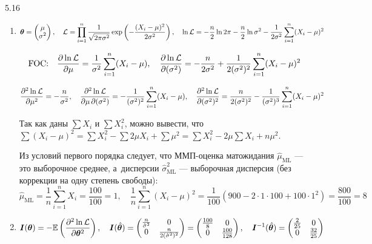 \begin{solution}{{5.16}}
  \begin{enumerate}
  \item
\[
\boldsymbol{\theta} =
\begin{pmatrix} \mu \\ \sigma^2 \end{pmatrix}, \quad
\mathcal{L} = \prod_{i=1}^n \frac{1}{\sqrt{2\pi\sigma^2}} \exp \left( -\frac{(X_i-\mu)^2}{2\sigma^2} \right), \quad
\ln \mathcal{L} = -\frac{n}{2}\ln 2\pi - \frac{n}{2} \ln \sigma^2 - \frac{1}{2\sigma^2} \sum\limits_{i=1}^n (X_i-\mu)^2
\]

\[
\text{FOC:} \quad
\frac{\partial \ln \mathcal{L}}{\partial \mu} = \frac{1}{\sigma^2} \sum\limits_{i=1}^n (X_i-\mu), \quad \frac{\partial \ln \mathcal{L}}{\partial (\sigma^2)} = -\frac{n}{2\sigma^2} + \frac{1}{2(\sigma^2)^2} \sum\limits_{i=1}^n (X_i-\mu)^2
\]

\[
\frac{\partial^2 \ln \mathcal{L}}{\partial \mu^2} = -\frac{n}{\sigma^2}, \quad \frac{\partial^2 \ln \mathcal{L}}{\partial \mu \, \partial (\sigma^2)} = -\frac{1}{(\sigma^2)^2} \sum\limits_{i=1}^n (X_i - \mu), \quad \frac{\partial^2 \ln \mathcal{L}}{\partial (\sigma^2)^2} = \frac{n}{2(\sigma^2)^2} - \frac{1}{(\sigma^2)^3} \sum\limits_{i=1}^n (X_i - \mu)^2
\]

Так как даны $\sum X_i$ и $\sum X_i^2$, можно вывести, что $\sum(X_i - \mu)^2 = \sum X_i^2 - \sum 2\mu X_i + \sum \mu^2 = \sum X_i^2 - 2\mu \sum X_i + n \mu^2$.

Из условий первого порядка следует, что ММП-оценка матожидания $\hat\mu_{\text{ML}}$ — это выборочное среднее, а~дисперсии $\hat\sigma^2_{\text{ML}}$ — выборочная дисперсия (без коррекции на одну степень свободы):
\[
\hat \mu_{\text{ML}} = \frac1n \sum\limits_{i=1}^n X_i = \frac{100}{100} = 1, \quad \frac{1}{n}\sum\limits_{i=1}^n (X_i - \mu)^2  = \frac{1}{100}(900 - 2\cdot 1 \cdot 100 + 100\cdot 1^2) = \frac{800}{100} = 8
\]

\item
\[
\boldsymbol{I}(\boldsymbol{\theta}) = -\mathbb{E}\left( \frac{\partial^2 \ln \mathcal{L}}{\partial \boldsymbol{\theta}^2} \right), \quad \boldsymbol{I}(\hat{\boldsymbol{\theta}}) = \begin{pmatrix} \frac{n}{\hat\sigma^2} & 0 \\ 0 & \frac{n}{2(\hat\sigma^2)^2} \end{pmatrix} = \begin{pmatrix} \frac{100}{8} & 0 \\ 0 & \frac{100}{128}  \end{pmatrix}, \quad \boldsymbol{I}^{-1}(\hat{\boldsymbol{\theta}}) = \begin{pmatrix} \frac{2}{25} & 0 \\ 0 & \frac{32}{25} \end{pmatrix}
\]


\end{enumerate}
\end{solution}
